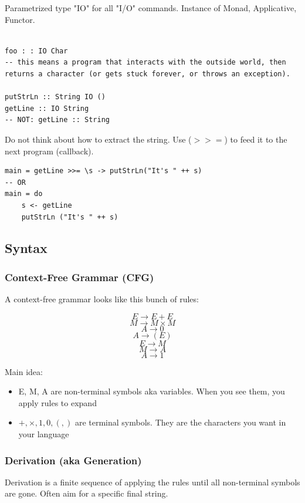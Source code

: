 \documentclass[12pt]{article}
\begin{document}
Parametrized type "IO" for all "I\slash O" commands. Instance of Monad, Applicative, Functor.\\
\\
\begin{lstlisting}
foo : : IO Char
-- this means a program that interacts with the outside world, then returns a character (or gets stuck forever, or throws an exception).

putStrLn :: String IO ()
getLine :: IO String
-- NOT: getLine :: String

\end{lstlisting}

Do not think about how to extract the string. Use ($>>=$) to feed it to the next program (callback).

\begin{lstlisting}
main = getLine >>= \s -> putStrLn("It's " ++ s)
-- OR
main = do
	s <- getLine
	putStrLn ("It's " ++ s)
\end{lstlisting}

\subsection{Syntax}

\subsubsection{Context-Free Grammar (CFG)}

A context-free grammar looks like this bunch of rules:

$$E \rightarrow E+E$$
$$M \rightarrow M\times M$$
$$A \rightarrow 0$$
$$A \rightarrow (E)$$
$$E \rightarrow M$$
$$M \rightarrow A$$
$$A \rightarrow 1$$

Main idea:
\begin{itemize}
	\item{E, M, A are non-terminal symbols aka variables. When you see them, you apply rules to expand}
	\item{$+, \times, 1, 0, (, )$ are terminal symbols. They are the characters you want in your language}
\end{itemize}

\subsubsection{Derivation (aka Generation)}

Derivation is a finite sequence of applying the rules until all non-terminal symbols are gone. Often aim for a specific final string.
\end{document}
